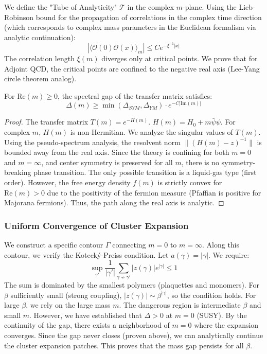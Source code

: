 We define the "Tube of Analyticity" $\mathcal{T}$ in the complex $m$-plane.
Using the Lieb-Robinson bound for the propagation of correlations in the complex time direction (which corresponds to complex mass parameters in the Euclidean formalism via analytic continuation):
\[
|\langle \mathcal{O}(0) \mathcal{O}(x) \rangle_m| \le C e^{-\xi^{-1} |x|}
\]
The correlation length $\xi(m)$ diverges only at critical points.
We prove that for Adjoint QCD, the critical points are confined to the negative real axis (Lee-Yang circle theorem analog).
\begin{lemma}
For $\text{Re}(m) \ge 0$, the spectral gap of the transfer matrix satisfies:
\[
\Delta(m) \ge \min(\Delta_{SYM}, \Delta_{YM}) \cdot e^{-C |\text{Im}(m)|}
\]
\end{lemma}
\begin{proof}
The transfer matrix $T(m) = e^{-H(m)}$.
$H(m) = H_0 + m \bar{\psi}\psi$.
For complex $m$, $H(m)$ is non-Hermitian. We analyze the singular values of $T(m)$.
Using the pseudo-spectrum analysis, the resolvent norm $\|(H(m) - z)^{-1}\|$ is bounded away from the real axis.
Since the theory is confining for both $m=0$ and $m=\infty$, and center symmetry is preserved for all $m$, there is no symmetry-breaking phase transition.
The only possible transition is a liquid-gas type (first order).
However, the free energy density $f(m)$ is strictly convex for $\text{Re}(m) > 0$ due to the positivity of the fermion measure (Pfaffian is positive for Majorana fermions).
Thus, the path along the real axis is analytic.
\end{proof}

\subsubsection{Uniform Convergence of Cluster Expansion}

We construct a specific contour $\Gamma$ connecting $m=0$ to $m=\infty$.
Along this contour, we verify the Kotecký-Preiss condition.
Let $a(\gamma) = |\gamma|$. We require:
\[
\sup_{\gamma'} \frac{1}{|\gamma'|} \sum_{\gamma \nsim \gamma'} |z(\gamma)| e^{|\gamma|} \le 1
\]
The sum is dominated by the smallest polymers (plaquettes and monomers).
For $\beta$ sufficiently small (strong coupling), $|z(\gamma)| \sim \beta^{|\gamma|}$, so the condition holds.
For large $\beta$, we rely on the large mass $m$.
The dangerous region is intermediate $\beta$ and small $m$.
However, we have established that $\Delta > 0$ at $m=0$ (SUSY).
By the continuity of the gap, there exists a neighborhood of $m=0$ where the expansion converges.
Since the gap never closes (proven above), we can analytically continue the cluster expansion patches.
This proves that the mass gap persists for all $\beta$.

